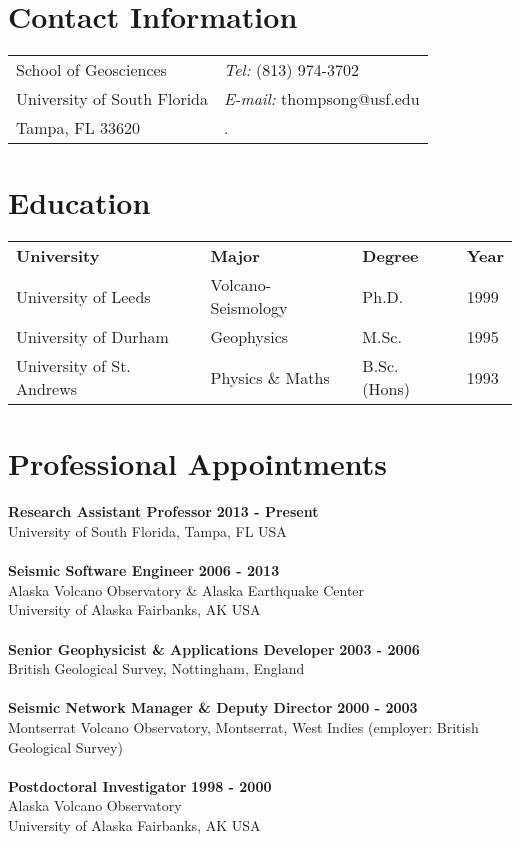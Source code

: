 \documentclass[margin,line]{res}
\begin{document}
\begin{resume}

\vspace{-10pt}
\section{\sc Contact Information}
\vspace{.05in}
\begin{tabular}{@{}p{4in}p{4in}}
School of Geosciences & {\it Tel:} (813) 974-3702  \\            
University of South Florida &  {\it E-mail:} thompsong@usf.edu \\      
Tampa, FL 33620  & .\\     
\end{tabular}

\section{\sc Education}
\begin{tabular}{@{}p{2in}p{2in}p{1in}p{1.2in}}
{\bf University} & {\bf Major} & {\bf Degree} & {\bf Year} \\
University of Leeds & Volcano-Seismology & Ph.D. & 1999 \\
University of Durham & Geophysics & M.Sc. & 1995 \\
University of St. Andrews & Physics \& Maths & B.Sc. (Hons) & 1993 \\
\end{tabular}
%
\section{\sc Professional Appointments}
%
{\bf Research Assistant Professor} \hfill {\bf 2013 - Present} \\
University of South Florida, Tampa, FL USA\\
\\
%
{\bf Seismic Software Engineer} \hfill {\bf 2006 - 2013} \\
Alaska Volcano Observatory \& Alaska Earthquake Center\\
University of Alaska Fairbanks, AK USA\\
\\
%
{\bf Senior Geophysicist \& Applications Developer} \hfill {\bf 2003 - 2006} \\
British Geological Survey, Nottingham, England \\
\\
%
{\bf Seismic Network Manager \& Deputy Director} \hfill {\bf 2000 - 2003} \\
Montserrat Volcano Observatory, Montserrat, West Indies (employer: British Geological Survey) \\
\\
%
{\bf Postdoctoral Investigator} \hfill {\bf 1998 - 2000} \\
Alaska Volcano Observatory\\
University of Alaska Fairbanks, AK USA\\
%

\end{resume}
\end{document}
